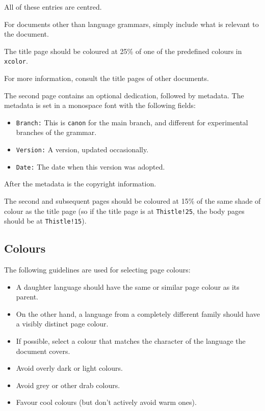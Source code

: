 \documentclass{book}
\begin{document}
All of these entries are centred.

For documents other than language grammars, simply include what is relevant to the document.

The title page should be coloured at 25\% of one of the predefined colours in \texttt{xcolor}.

For more information, consult the title pages of other documents.

The second page contains an optional dedication, followed by metadata. The metadata is set in a monospace font with the following fields:

\begin{itemize}
  \item \texttt{Branch:} This is \texttt{canon} for the main branch, and different for experimental branches of the grammar.
  \item \texttt{Version:} A version, updated occasionally.
  \item \texttt{Date:} The date when this version was adopted.
\end{itemize}

After the metadata is the copyright information.

The second and subsequent pages should be coloured at 15\% of the same shade of colour as the title page (so if the title page is at \texttt{Thistle!25}, the body pages should be at \texttt{Thistle!15}).

\subsection{Colours}

The following guidelines are used for selecting page colours:

\begin{itemize}
  \item A daughter language should have the same or similar page colour as its parent.
  \item On the other hand, a language from a completely different family should have a visibly distinct page colour.
  \item If possible, select a colour that matches the character of the language the document covers.
  \item Avoid overly dark or light colours.
  \item Avoid grey or other drab colours.
  \item Favour cool colours (but don't actively avoid warm ones).
\end{itemize}
\end{document}
